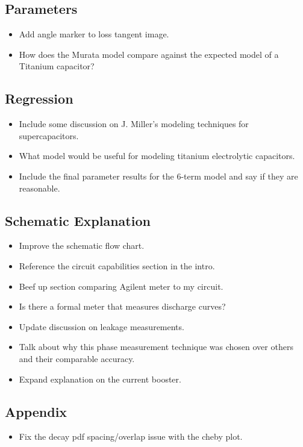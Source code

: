 \documentclass{article}
\begin{document}
\subsection{Parameters}
\begin{itemize}
    \item Add angle marker to loss tangent image.
    \item How does the Murata model compare against the expected model of a Titanium capacitor?
\end{itemize}

\subsection{Regression}
\begin{itemize}
    \item Include some discussion on J. Miller's modeling techniques for supercapacitors.
    \item What model would be useful for modeling titanium electrolytic capacitors.
    \item Include the final parameter results for the 6-term model and say if they are reasonable.
\end{itemize}

\subsection{Schematic Explanation}
\begin{itemize}
    \item Improve the schematic flow chart.
    \item Reference the circuit capabilities section in the intro.
    \item Beef up section comparing Agilent meter to my circuit.
    \item Is there a formal meter that measures discharge curves?
    \item Update discussion on leakage measurements.
    \item Talk about why this phase measurement technique was chosen over others and their comparable accuracy.
    \item Expand explanation on the current booster.
\end{itemize}

\subsection{Appendix}
\begin{itemize}
    \item Fix the decay pdf spacing/overlap issue with the cheby plot.
\end{itemize}
\end{document}
